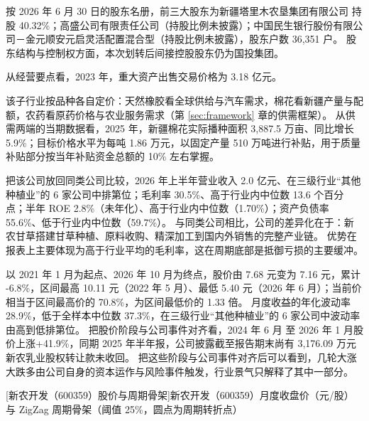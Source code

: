  按 2026 年 6 月 30 日的股东名册，前三大股东为新疆塔里木农垦集团有限公司 持股 40.32\%；高盛公司有限责任公司（持股比例未披露）；中国民生银行股份有限公司－金元顺安元启灵活配置混合型（持股比例未披露），股东户数 36,351 户。 股东结构与控制权方面，本次划转后间接控股股东仍为国投集团。

 从经营要点看，2023 年，重大资产出售交易价格为 3.18 亿元。

 该子行业按品种各自定价：天然橡胶看全球供给与汽车需求，棉花看新疆产量与配额，农药看原药价格与农业服务需求（第 \ref{sec:framework} 章的供需框架）。 从供需两端的当期数据看，2025 年，新疆棉花实际播种面积 3,887.5 万亩、同比增长 5.9\%；目标价格水平为每吨 1.86 万元，以固定产量 510 万吨进行补贴，用于质量补贴部分按当年补贴资金总额的 10\% 左右掌握。

 把该公司放回同类公司比较，2026 年上半年营业收入 2.0 亿元、在三级行业“其他种植业”的 6 家公司中排第位；毛利率 30.5\%、高于行业内中位数 13.6 个百分点；半年 ROE 2.8\%（未年化）、高于行业内中位数（1.70\%）；资产负债率 55.6\%、低于行业内中位数（59.7\%）。 与同类公司相比，公司的差异化在于：新农甘草搭建甘草种植、原料收购、精深加工到国内外销售的完整产业链。 优势在报表上主要体现为高于行业平均的毛利率，这在周期底部是抵御亏损的主要缓冲。

 以 2021 年 1 月为起点、2026 年 10 月为终点，股价由 7.68 元变为 7.16 元，累计 -6.8\%，区间最高 10.11 元（2022 年 5 月）、最低 5.40 元（2026 年 6 月）；当前价相当于区间最高价的 70.8\%，为区间最低价的 1.33 倍。 月度收益的年化波动率 28.9\%，低于全样本中位数 37.3\%，在三级行业“其他种植业”的 6 家公司中波动率由高到低排第位。 把股价阶段与公司事件对齐看，2024 年 6 月 至 2026 年 1 月股价上涨+41.9\%，同期 2025 年半年报，公司披露截至报告期末尚有 3,176.09 万元新农乳业股权转让款未收回。 把这些阶段与公司事件对齐后可以看到，几轮大涨大跌多由公司自身的资本运作与风险事件触发，行业景气只解释了其中一部分。

\begin{center}
\begin{minipage}{\textwidth}\centering
{}

[新农开发（600359）股价与周期骨架]{新农开发（600359）月度收盘价（元/股）与 ZigZag 周期骨架（阈值 25\%，圆点为周期转折点）}
\end{minipage}
\end{center}

